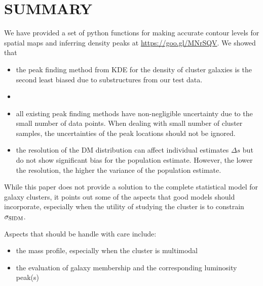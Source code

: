 \section{SUMMARY}
We have provided a set of python functions for making accurate contour levels
for spatial maps and inferring density peaks at 
\href{https://goo.gl/MNrSQV}{https://goo.gl/MNrSQV}.
We showed that 
\begin{itemize}
		\item  the peak finding method from KDE for the density of cluster
			galaxies is the second least biased due to substructures from our test data. 
		\item  
		\item  all existing peak finding methods have non-negligible uncertainty 
			due to the small number of data points. When dealing with small number of
			cluster samples, the uncertainties of the peak locations should not be
			ignored.
		\item the resolution of the DM distribution can affect
			individual estimates $\Delta s$ but do not show significant bias for
			the population estimate. However, the lower the resolution, the higher
			the variance of the population estimate.  
\end{itemize}
While this paper does not provide a solution to the complete statistical model
for galaxy clusters, it points out some of the aspects that good models should
incorporate, especially when the utility of studying the cluster is to
constrain $\sigma_{\rm SIDM}$.

Aspects that should be handle with care include:
\begin{itemize}
		\item the mass profile, especially when the cluster is multimodal 
		\item the evaluation of galaxy membership and the corresponding luminosity
			peak(s)
	\end{itemize}



